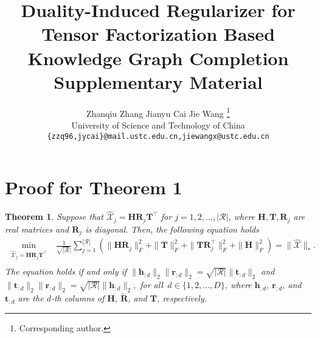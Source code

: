 \documentclass{article}
\title{Duality-Induced Regularizer for Tensor Factorization Based Knowledge Graph Completion\\
\vspace{3mm}
Supplementary Material}
\author{Zhanqiu Zhang \qquad
  Jianyu Cai \qquad
  Jie Wang \thanks{Corresponding author.} \vspace{1mm}\\
University of Science and Technology of China\\
\texttt{\{zzq96,jycai\}@mail.ustc.edu.cn,jiewangx@ustc.edu.cn}
}
\newtheorem{theorem}{Theorem}
\begin{document}
\maketitle

\section{Proof for Theorem 1}
\begin{theorem}\label{thm:main}
Suppose that $\hat{\mathcal{X}}_j=\textbf{H}\textbf{R}_j\textbf{T}^\top$ for $j=1,2,\dots,|\mathcal{R}|$, where $\textbf{H},\textbf{T},\textbf{R}_j$ are real matrices and $\textbf{R}_j$ is diagonal. Then, the following equation holds
\begin{align*}
    \min_{\substack{\hat{\mathcal{X}}_j=\textbf{H} \textbf{R}_j\textbf{T}^\top\\  }}&\frac{1}{\sqrt{|\mathcal{R}}|}\sum_{j=1}^{|\mathcal{R}|}(\|\textbf{H}\textbf{R}_j\|_F^2+\|\textbf{T}\|_F^2+\|\textbf{T}\textbf{R}_j^\top\|_F^2+\|\textbf{H}\|_F^2)=\|\hat{\mathcal{X}}\|_*.
\end{align*}
The equation holds if and only if
$
  \|\textbf{h}_{:d}\|_2\|\textbf{r}_{:d}\|_2=\sqrt{|\mathcal{R}|}\|\textbf{t}_{:d}\|_2
$
and
$
  \|\textbf{t}_{:d}\|_2\|\textbf{r}_{:d}\|_2=\sqrt{|\mathcal{R}|}\|\textbf{h}_{:d}\|_2,
$
for all $\,d\in\{1,2,\ldots, D\}$,
where $\textbf{h}_{:d}$, $\textbf{r}_{:d}$, and $\textbf{t}_{:d}$ are the $d$-th columns of $\textbf{H}$, $\widetilde{\textbf{R}}$, and $\textbf{T}$, respectively.
\end{theorem}
\end{document}
